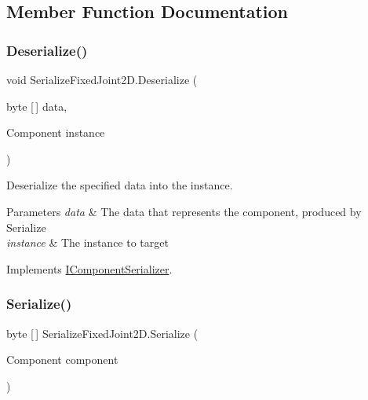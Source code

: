 \subsection{Member Function Documentation}
\mbox{\label{class_serialize_fixed_joint2_d_aa2cc872282e6bb7c209ac406fb0b8335}} 
\subsubsection{\texorpdfstring{Deserialize()}{Deserialize()}}
{\footnotesize\ttfamily void Serialize\+Fixed\+Joint2\+D.\+Deserialize (\begin{DoxyParamCaption}\item[{byte \mbox{[}$\,$\mbox{]}}]{data,  }\item[{Component}]{instance }\end{DoxyParamCaption})\hspace{0.3cm}{\ttfamily [inline]}}



Deserialize the specified data into the instance. 


\begin{DoxyParams}{Parameters}
{\em data} & The data that represents the component, produced by Serialize \\
\hline
{\em instance} & The instance to target \\
\hline
\end{DoxyParams}


Implements \hyperlink{interface_i_component_serializer_a4cc366a5c78b33d47a90c209d8fed883}{I\+Component\+Serializer}.

\mbox{\label{class_serialize_fixed_joint2_d_a9eb05bc525fe5cbf55dd5e917e2f36f2}} 
\subsubsection{\texorpdfstring{Serialize()}{Serialize()}}
{\footnotesize\ttfamily byte \mbox{[}$\,$\mbox{]} Serialize\+Fixed\+Joint2\+D.\+Serialize (\begin{DoxyParamCaption}\item[{Component}]{component }\end{DoxyParamCaption})\hspace{0.3cm}{\ttfamily [inline]}}




